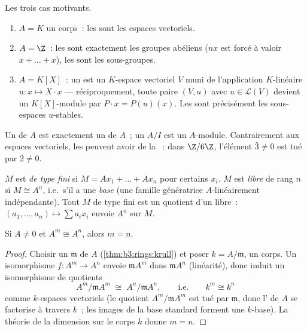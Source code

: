 \begin{example}\label{ex:b3:modules:examples}
Les trois cas motivants.
\begin{enumerate}
  \item $A = K$ un corps~: les  sont les espaces
        vectoriels.
  \item $A = \Z$~: les  sont exactement les groupes
        abéliens ($nx$ est forcé à valoir $x + \dots + x$), les
         sont les sous-groupes.
  \item $A = K[X]$~: un  est un $K$-espace vectoriel $V$
        muni de l'application $K$-linéaire $u\colon x \mapsto
        X\cdot x$ --- réciproquement, toute paire $(V, u)$ avec
        $u \in \mathcal L(V)$ devient un $K[X]$-module par $P
        \cdot x = P(u)(x)$. Les  sont précisément
        les sous-espaces $u$-stables.
\end{enumerate}
Un  de $A$ est exactement un  de $A$~; un  $A/I$ est un $A$-module. Contrairement aux espaces
vectoriels, les  peuvent avoir de la \emph{}~:
dans $\Z/6\Z$, l'élément $\bar 3 \ne 0$ est tué par $2 \neq 0$.
\end{example}

\begin{definition}\label{def:b3:modules:free}
$M$ est \emph{de type fini} si $M =
Ax_1 + \dots + Ax_n$ pour certains $x_i$. $M$ est
\emph{libre} de rang $n$ si $M \cong A^n$,
i.e.\ s'il a une \emph{base} (une famille génératrice
$A$-linéairement indépendante). Tout $M$ de type fini est un
quotient d'un  libre~: $(a_1, \dots, a_n) \mapsto \sum
a_ix_i$ envoie $A^n$ sur $M$.
\end{definition}

\begin{proposition}\label{prop:b3:modules:rank}
Si $A \neq 0$ et $A^m \cong A^n$, alors $m = n$.
\end{proposition}

\begin{proof}
Choisir un  $\mathfrak m$ de $A$
(\cref{thm:b3:rings:krull}) et poser $k = A/\mathfrak m$, un
corps. Un isomorphisme $f \colon A^m \to A^n$ envoie $\mathfrak
m A^m$ dans $\mathfrak m A^n$ (linéarité), donc induit un
isomorphisme de quotients
\[
A^m/\mathfrak m A^m \;\cong\; A^n/\mathfrak m A^n,
\qquad\text{i.e.}\qquad k^m \cong k^n
\]
comme $k$-espaces vectoriels (le quotient $A^m/\mathfrak m A^m$
est tué par $\mathfrak m$, donc l' de $A$ se factorise à
travers $k$~; les images de la base standard forment une
$k$-base). La théorie de la dimension sur le corps $k$ donne $m
= n$.
\end{proof}

